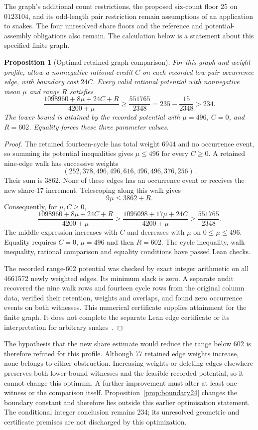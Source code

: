 \documentclass[11pt,a4paper]{article}
\newtheorem{proposition}[theorem]{Proposition}
\theoremstyle{definition}
\theoremstyle{remark}
\begin{document}
The graph's additional count restrictions, the proposed six-count floor
25 on $0123104$, and its odd-length pair restriction remain assumptions
of an application to snakes. The four unresolved share floors and the
reference and potential-assembly obligations also remain. The calculation
below is a statement about this specified finite graph.

\begin{proposition}[Optimal retained-graph comparison]\label{prop:range156-optimum}
For this graph and weight profile, allow a nonnegative rational credit $C$
on each recorded low-pair occurrence edge, with boundary cost $24C$.
Every valid rational potential with nonnegative mean $\mu$ and range $R$
satisfies
\[
\frac{1098960+8\mu+24C+R}{4200+\mu}
\ge\frac{551765}{2348}
=235-\frac{15}{2348}>234.
\]
The lower bound is attained by the recorded potential with
$\mu=496$, $C=0$, and $R=602$. Equality forces these three parameter values.
\end{proposition}
\begin{proof}
The retained fourteen-cycle has total weight 6944 and no occurrence event,
so summing its potential inequalities gives $\mu\le496$ for every $C\ge0$.
A retained nine-edge walk has successive weights
\[
(252,378,496,496,616,496,496,376,256).
\]
Their sum is 3862. None of these edges has an occurrence event or receives
the new share-17 increment. Telescoping along this walk gives
\[
9\mu\le3862+R.
\]
Consequently, for $\mu,C\ge0$,
\[
\frac{1098960+8\mu+24C+R}{4200+\mu}
\ge\frac{1095098+17\mu+24C}{4200+\mu}
\ge\frac{551765}{2348}.
\]
The middle expression increases with $C$ and decreases with
$\mu$ on $0\le\mu\le496$. Equality requires $C=0$, $\mu=496$ and then
$R=602$. The cycle inequality, walk inequality, rational comparison and
equality conditions have passed Lean checks.

The recorded range-602 potential was checked by exact integer arithmetic
on all 4661572 newly weighted edges. Its minimum slack is zero. A separate
audit recovered the nine walk rows and fourteen cycle rows from the
original column data, verified their retention, weights and overlaps,
and found zero occurrence events on both witnesses. This numerical
certificate supplies attainment for the finite graph. It does not
complete the separate Lean edge certificate or its interpretation for
arbitrary snakes~\cite{range156archive}.
\end{proof}

The hypothesis that the new share estimate would reduce the range below
602 is therefore refuted for this profile. Although 77 retained edge
weights increase, none belongs to either obstruction. Increasing weights
or deleting edges elsewhere preserves both lower-bound witnesses and
the feasible recorded potential, so it cannot change this optimum.
A further improvement must alter at least one witness or the comparison
itself. Proposition~\ref{prop:boundary24} changes the boundary constant and
therefore lies outside this earlier optimisation statement. The conditional integer conclusion remains 234; its unresolved
geometric and certificate premises are not discharged by this optimization.
\end{document}
